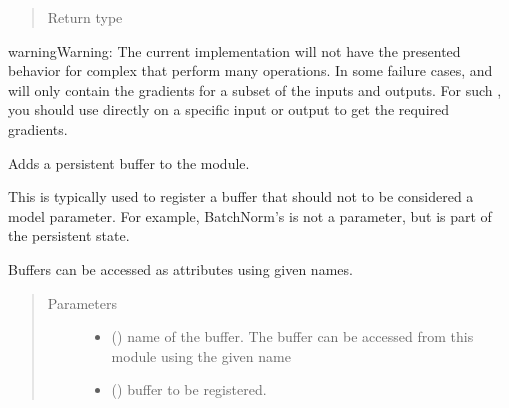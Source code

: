 \documentclass[letterpaper,10pt,english]{sphinxmanual}
\begin{document}
\begin{fulllineitems}
\begin{fulllineitems}
\begin{quote}
\begin{description}
\item[{Return type}] \leavevmode
{}

\end{description}\end{quote}

\begin{sphinxadmonition}{warning}{Warning:}
The current implementation will not have the presented behavior
for complex  that perform many operations.
In some failure cases,  and  will only
contain the gradients for a subset of the inputs and outputs.
For such , you should use 
directly on a specific input or output to get the required gradients.
\end{sphinxadmonition}

\end{fulllineitems}


\begin{fulllineitems}
\label{\detokenize{api/dynamics:geology.metamodelling.dynamics.NeuralDifferentialEquation.register_buffer}}
Adds a persistent buffer to the module.

This is typically used to register a buffer that should not to be
considered a model parameter. For example, BatchNorm’s 
is not a parameter, but is part of the persistent state.

Buffers can be accessed as attributes using given names.
\begin{quote}\begin{description}
\item[{Parameters}] \leavevmode\begin{itemize}
\item {} 
 () \textendash{} name of the buffer. The buffer can be accessed
from this module using the given name

\item {} 
 () \textendash{} buffer to be registered.


\end{itemize}
\end{description}
\end{quote}
\end{fulllineitems}
\end{fulllineitems}
\end{document}
